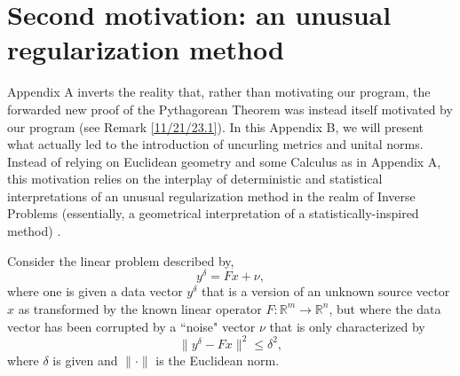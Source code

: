 \documentclass{amsart}
\numberwithin{equation}{section}
\theoremstyle{definition}
\numberwithin{theorem}{section}
\begin{document}
  \section{Second motivation: an unusual regularization method}
     Appendix A inverts the reality that, rather than motivating our program, the forwarded new proof of the Pythagorean Theorem was instead itself motivated by our program (see Remark \ref{11/21/23.1}). In this Appendix B, we will present what actually led to the introduction of uncurling metrics and unital norms.  Instead of relying on Euclidean geometry and some Calculus as in Appendix A, this motivation relies on the interplay of deterministic and statistical interpretations of an unusual regularization method in the realm of Inverse Problems (essentially, a geometrical interpretation of a statistically-inspired method) \cite{fgreensite:2022d}.
  
    
 Consider the linear problem described by, \begin{equation}\label{7/7/20.9}  y^\delta=Fx + \nu,\end{equation} where one is given a data vector $y^\delta$ that is a version of an unknown source vector $x$ as transformed by the known linear operator $F:\mathbb{R}^m\rightarrow\mathbb{R}^n$, but where the data vector has been corrupted by a ``noise" vector $\nu$ that is only characterized by \begin{equation}\label{7/12/20.1} \| y^\delta - Fx\|^2 \le \delta^2,\end{equation} where $\delta$ is given and $\|\cdot \|$ is the Euclidean norm.  
    
\end{document}
